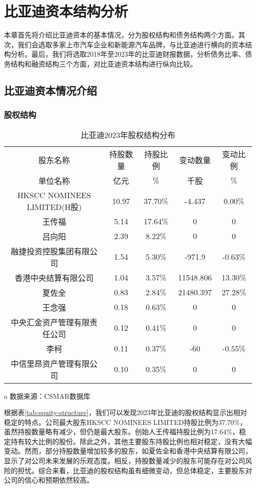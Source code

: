 \chapter{比亚迪资本结构分析}
本章首先将介绍比亚迪资本的基本情况，分为股权结构和债务结构两个方面。其次，我们会选取多家上市汽车企业和新能源汽车品牌，与比亚迪进行横向的资本结构分析。最后，我们将选取2018年至2023年的比亚迪财报数据，分析债务比率、债务结构和融资结构三个方面，对比亚迪资本结构进行纵向比较。
\section{比亚迪资本情况介绍}
\subsection{股权结构}
\begin{table}
  \centering
  \begin{threeparttable}[c]
    \caption{比亚迪2023年股权结构分布}
    \label{tab:equity-structure}
    \begin{tabular}{ccccc}
      \toprule
        股东名称 & 持股数量 & 持股比例 & 变动数量 & 变动比例 \\ 
        单位名称 & 亿元    &  \%      &  千股   &  \%      \\
      \midrule
        HKSCC NOMINEES LIMITED(H股) & 10.97  & 37.70\% & -4.437 & 0.00\% \\ 
        王传福 & 5.14  & 17.64\% & 0 & 0 \\ 
        吕向阳 & 2.39  & 8.22\% & 0 & 0 \\ 
        融捷投资控股集团有限公司 & 1.54  & 5.30\% & -971.9 & -0.63\% \\ 
        香港中央结算有限公司 & 1.04  & 3.57\% & 11548.806 & 13.30\% \\ 
        夏佐全 & 0.83  & 2.84\% & 21480.397 & 27.28\% \\ 
        王念强 & 0.18  & 0.63\% & 0 & 0 \\ 
        中央汇金资产管理有限责任公司 & 0.12  & 0.41\% & 0 & 0 \\ 
        李柯 & 0.11  & 0.37\% & -60 & -0.55\% \\ 
        中信里昂资产管理有限公司 & 0.10  & 0.35\% & 0 & 0 \\ 
      \bottomrule
    \end{tabular}
    \begin{tablenotes}
      \item [a] 数据来源：CSMAR数据库
    \end{tablenotes}
  \end{threeparttable}
\end{table}
根据表\eqref{tab:equity-structure}，我们可以发现2023年比亚迪的股权结构显示出相对稳定的特点。公司最大股东HKSCC NOMINEES LIMITED持股比例为37.70\%，虽然持股数量略有减少，但仍是最大股东。创始人王传福持股比例为17.64\%，稳定持有较大比例的股份。除此之外，其他主要股东持股比例也相对稳定，没有大幅变动。然而，部分持股数量增加较多的股东，如夏佐全和香港中央结算有限公司，显示了对公司未来发展的乐观态度。相反，持股数量减少的股东可能存在对公司风险的担忧。综合来看，比亚迪的股权结构虽有细微变动，但总体稳定，主要股东对公司的信心和预期依然较高。
